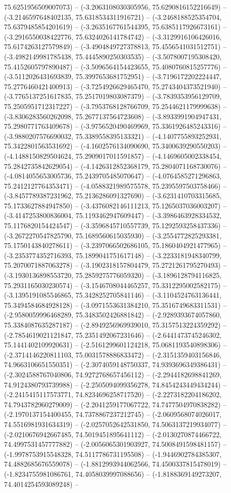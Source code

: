 75.6251956509007073) -- (-3.2063108030305956, 75.6290816152216649) -- (-3.2146597648402135, 75.6318534311916721) -- (-3.2468188525354704, 75.6379485854201619) -- (-3.2635167761544395, 75.6385117926673161) -- (-3.2916550038422776, 75.6324026141784742) -- (-3.3129916106426016, 75.6174263127579849) -- (-3.4904849727378813, 75.4556541031512751) -- (-3.4982149981785438, 75.4445890250303535) -- (-3.5078007195308420, 75.4152605797890487) -- (-3.5096564154423655, 75.4080760815257776) -- (-3.5112026431693839, 75.3997653681752951) -- (-3.7196172202224447, 75.2776460421400913) -- (-3.7254926629465470, 75.2743404373521940) -- (-3.7765137251617835, 75.2517019803087379) -- (-3.7839353956129709, 75.2505951712317227) -- (-3.7953768128766709, 75.2544621179999638) -- (-3.8306283560262098, 75.2677137564723608) -- (-3.8933991904947431, 75.2980771763409678) -- (-3.9756520490469969, 75.3361926485243316) -- (-3.9880207576690032, 75.3389558395133321) -- (-4.1407755893252931, 75.3422801563531692) -- (-4.1602576134090690, 75.3400639290550203) -- (-4.1488150829504624, 75.2909017011591857) -- (-4.1469605002338454, 75.2842735842629054) -- (-4.1426312852368179, 75.2804071168730076) -- (-4.0814055653005736, 75.2439705485070647) -- (-4.0764585271296863, 75.2412127764353471) -- (-4.0588321989575578, 75.2395597503758466) -- (-3.8457789387231962, 75.2136286091327690) -- (-3.6231410703315685, 75.1733627884947850) -- (-3.4376082146111213, 75.1265037036003207) -- (-3.4147253800836004, 75.1193462947609447) -- (-3.3986463928334532, 75.1176820154424547) -- (-3.3596845710557739, 75.1292593258437336) -- (-3.2672270547825790, 75.1689560615035930) -- (-3.2554772825293381, 75.1750143840278611) -- (-3.2397066502686105, 75.1860404921477965) -- (-3.2353774352716393, 75.1899041751617148) -- (-3.2233181948340799, 75.2070071887063278) -- (-3.1902318157804479, 75.2721261795270493) -- (-3.1930136898553720, 75.2859275776059320) -- (-3.1896128794116825, 75.2931165030230574) -- (-3.1546708044465257, 75.3312295002582175) -- (-3.1395191085546865, 75.3428252705841146) -- (-3.1104524763136441, 75.3494584684928128) -- (-3.0971553631384210, 75.3516749683311531) -- (-2.9580059996468289, 75.3483502426881842) -- (-2.9289393674057860, 75.3384087635287187) -- (-2.8949256969939010, 75.3157513224359292) -- (-2.7854619021121847, 75.2351492067231646) -- (-2.6441473745246302, 75.1441402109920631) -- (-2.5161299601124218, 75.0681193540898306) -- (-2.3714146220811103, 75.0031578886833472) -- (-2.3151359403156846, 74.9663106651550351) -- (-2.3074059148750337, 74.9393696349386431) -- (-2.3024588767040806, 74.9272768657456112) -- (-2.2944182698841269, 74.9124380793739988) -- (-2.2505094099356278, 74.8454243449434244) -- (-2.2415415117573771, 74.8234696258717520) -- (-2.2273182204186202, 74.7943782960279009) -- (-2.2041259177067722, 74.7477504970838282) -- (-2.1970137154400455, 74.7378867237212745) -- (-2.0609568074026017, 74.5516981931634319) -- (-2.0257052642531850, 74.5063137219934077) -- (-2.0210676942667485, 74.5019451895641112) -- (-2.0130270874466722, 74.4997531457777882) -- (-2.0056065301903927, 74.5008491598481157) -- (-1.9978753915548328, 74.5117786731195508) -- (-1.9446902784385307, 74.4882685676559078) -- (-1.8812993944062566, 74.4500337815478019) -- (-1.8234755981086761, 74.4058039997088656) -- (-1.8188369149273207, 74.4014254593089248) -- 